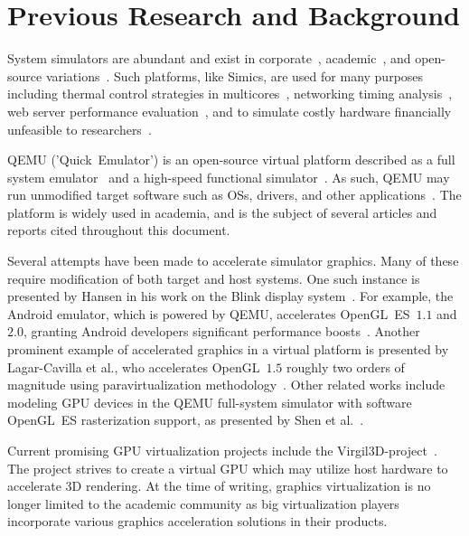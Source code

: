 
\section{Previous Research and Background}
\label{sec:previousresearch}
System simulators are abundant and exist in corporate~, academic~, and open-source variations~.
Such platforms, like Simics, are used for many purposes including thermal control strategies in multicores~, networking timing analysis~, web server performance evaluation~, and to simulate costly hardware financially unfeasible to researchers~.

QEMU ('Quick~Emulator') is an open-source virtual platform described as a full system emulator~ and a high-speed functional simulator~.
As such, QEMU may run unmodified target software such as OSs, drivers, and other applications~.
The platform is widely used in academia, and is the subject of several articles and reports cited throughout this document.

Several attempts have been made to accelerate simulator graphics.
Many of these require modification of both target and host systems.
One such instance is presented by Hansen in his work on the Blink display system~.
For example, the Android emulator, which is powered by QEMU, accelerates OpenGL~ES~$1.1$ and $2.0$, granting Android developers significant performance boosts~.
Another prominent example of accelerated graphics in a virtual platform is presented by Lagar-Cavilla et al., who accelerates OpenGL~$1.5$ roughly two orders of magnitude using paravirtualization methodology~.
Other related works include modeling GPU devices in the QEMU full-system simulator with software OpenGL~ES rasterization support, as presented by Shen et al.~.

Current promising GPU virtualization projects include the Virgil3D-project~.
The project strives to create a virtual GPU which may utilize host hardware to accelerate 3D rendering.
At the time of writing, graphics virtualization is no longer limited to the academic community as big virtualization players incorporate various graphics acceleration solutions in their products.

